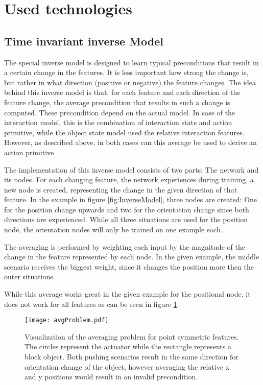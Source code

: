 \section{Used technologies \label{sec:technologies}}

\subsection{Time invariant inverse Model \label{sec:invModelRealization}} %

The special inverse model is designed to learn typical preconditions that result in a certain change in the features. It is less important how strong the change is, but rather in what direction (positive or negative) the feature changes. The idea behind this inverse model is that, for each feature and each direction of the feature change, the average precondition that results in such a change is computed. 
These precondition depend on the actual model. In case of the interaction model, this is the combination of interaction state and action primitive, while the object state model used the relative interaction features. However, as described above, in both cases can this average be used to derive an action primitive.

The implementation of this inverse model consists of two parts: The network and its nodes. For each changing feature, the network experiences during training, a new node is created, representing the change in the given direction of that feature. In the example in figure \ref{fig:InverseModel}, three nodes are created: One for the position change upwards and two for the orientation change since both directions are experienced. While all three situations are used for the position node, the orientation nodes will only be trained on one example each. 

The averaging is performed by weighting each input by the magnitude of the change in the feature represented by each node. In the given example, the middle scenario receives the biggest weight, since it changes the position more then the outer situations. 

While this average works great in the given example for the positional node, it does not work for all features as can be seen in figure \ref{fig:avgProblem}.

\begin{figure}
	\centering
	\texttt{[image: avgProblem.pdf]}
	\caption{Visualization of the averaging problem for point symmetric features. The circles represent the actuator while the rectangle represents a block object. Both pushing scenarios result in the same direction for orientation change of the object, however averaging the relative x and y positions would result in an invalid precondition.} 
	\label{fig:avgProblem}
\end{figure}

